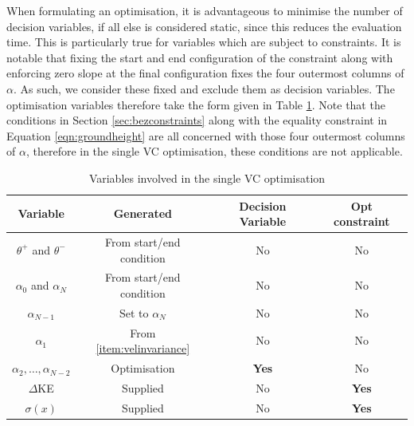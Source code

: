 When formulating an optimisation, it is advantageous to minimise the number of decision variables, if all else is considered static, since this reduces the evaluation time. This is particularly true for variables which are subject to constraints. It is notable that fixing the start and end configuration of the constraint along with enforcing zero slope at the final configuration fixes the four outermost columns of $\alpha$. As such, we consider these fixed and exclude them as decision variables. The optimisation variables therefore take the form given in Table \ref{tab:optDecVars}. Note that the conditions in Section \ref{sec:bezconstraints} along with the equality constraint in Equation \ref{eqn:groundheight} are all concerned with those four outermost columns of $\alpha$, therefore in the single VC optimisation, these conditions are not applicable.

\begin{table}
	\centering
	\begin{tabular}{c | c | c | c}
		            Variable             & Generated                     & Decision Variable & Opt constraint \\ \hline
		   $\theta^+$ and $\theta^-$     & From start/end condition      & No                & No             \\
		   $\alpha_0$ and $\alpha_N$     & From start/end condition      & No                & No             \\
		         $\alpha_{N-1}$          & Set to $\alpha_N$             & No                & No             \\
		           $\alpha_1$            & From \ref{item:velinvariance} & No                & No             \\
		$\alpha_2, \ldots, \alpha_{N-2}$ & Optimisation                  & \textbf{Yes}      & No             \\
		           $\Delta$KE            & Supplied                      & No                & \textbf{Yes}   \\
		           $\sigma(x)$             & Supplied                      & No                & \textbf{Yes}
	\end{tabular}
	\caption{Variables involved in the single VC optimisation}
	\label{tab:optDecVars}
\end{table}

